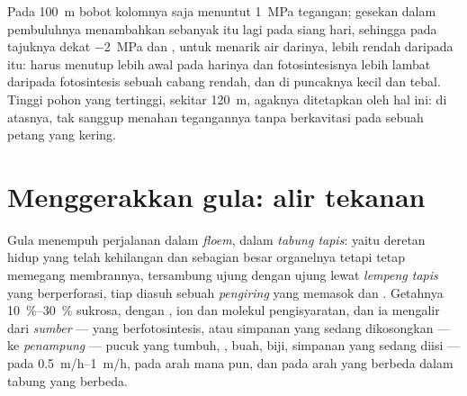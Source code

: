 \begin{example}\label{ex:b1:plant-transport:top}
Pada \qty{100}{m} bobot kolomnya saja menuntut \qty{1}{MPa} tegangan;
gesekan dalam pembuluhnya menambahkan sebanyak itu lagi pada siang
hari, sehingga  pada tajuknya dekat \qty{-2}{MPa} dan 
, untuk menarik air darinya, lebih rendah daripada itu:
 harus menutup lebih awal pada harinya dan fotosintesisnya
lebih lambat daripada fotosintesis sebuah cabang rendah, dan  di
puncaknya kecil dan tebal. Tinggi pohon yang tertinggi, sekitar
\qty{120}{m}, agaknya ditetapkan oleh hal ini: di atasnya,  tak
sanggup menahan tegangannya tanpa berkavitasi pada sebuah petang yang
kering.
\end{example}

\section{Menggerakkan gula: alir tekanan}

\begin{definition}\label{def:b1:plant-transport:phloem}
Gula menempuh perjalanan dalam \emph{floem}, dalam \emph{tabung
tapis}: yaitu deretan  hidup yang telah kehilangan  dan
sebagian besar organelnya tetapi tetap memegang membrannya, tersambung
ujung dengan ujung lewat \emph{lempeng tapis} yang berperforasi, tiap
 diasuh sebuah \emph{ pengiring} yang memasok  dan
. Getahnya \qtyrange{10}{30}{\%} sukrosa, dengan ,
ion dan molekul pengisyaratan, dan ia mengalir dari \emph{sumber} ---
 yang berfotosintesis, atau  simpanan yang sedang dikosongkan
--- ke \emph{penampung} --- pucuk yang tumbuh, , buah, biji, 
simpanan yang sedang diisi --- pada \qtyrange{0.5}{1}{m/h}, pada arah
mana pun, dan pada arah yang berbeda dalam tabung yang berbeda.
\end{definition}

